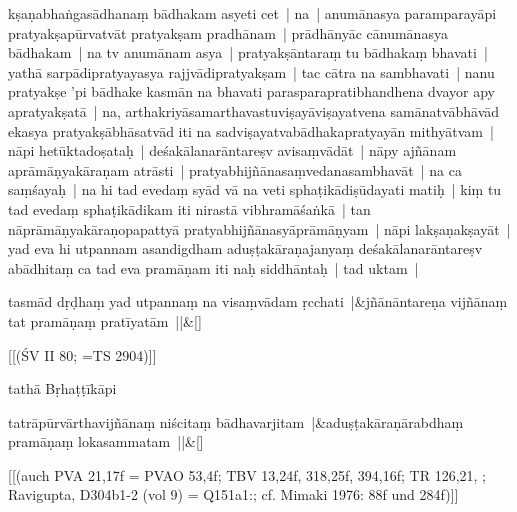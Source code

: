 \documentclass[article,12pt,a4paper]{memoir}
\begin{document}
	  \pstart kṣaṇabhaṅgasādhanaṃ bādhakam asyeti cet | na | anumānasya paramparayāpi pratyakṣapūrvatvāt pratyakṣam pradhānam | prādhānyāc cānumānasya bādhakam | na tv anumānam asya | pratyakṣāntaraṃ tu bādhakaṃ bhavati | yathā sarpādipratyayasya rajjvādipratyakṣam | tac cātra na sambhavati | \label{thakur75-112.28} nanu pratyakṣe 'pi bādhake kasmān na bhavati parasparapratibhandhena dvayor apy apratyakṣatā | \label{thakur75-112.28a} na, arthakriyāsamarthavastuviṣayāviṣayatvena samānatvābhāvād ekasya pratyakṣābhāsatvād iti na sadviṣayatvabādhakapratyayān mithyātvam | \label{thakur75-113.1} nāpi hetūktadoṣataḥ | deśakālanarāntareṣv avisaṃvādāt | \label{thakur75-113.2} nāpy ajñānam aprāmāṇyakāraṇam atrāsti | pratyabhijñānasaṃvedanasambhavāt | \label{thakur75-113.3} na ca saṃśayaḥ | na hi tad evedaṃ syād vā na veti sphaṭikādiṣūdayati matiḥ | kiṃ tu tad evedaṃ sphaṭikādikam iti nirastā vibhramāśaṅkā | tan nāprāmāṇyakāraṇopapattyā pratyabhijñānasyāprāmāṇyam | \label{thakur75-113.5} nāpi lakṣaṇakṣayāt | yad eva hi utpannam asandigdham aduṣṭakāraṇajanyaṃ deśakālanarāntareṣv abādhitaṃ ca tad eva pramāṇam iti naḥ siddhāntaḥ | tad uktam |
	\pend
      
	    
	    \stanza[\smallbreak]
	tasmād dṛḍhaṃ yad utpannaṃ na visaṃvādam ṛcchati |&jñānāntareṇa vijñānaṃ tat pramāṇaṃ pratīyatām ||\&[\smallbreak]


	[[(ŚV II 80; =TS 2904)]]

	  \pstart tathā Bṛhaṭṭīkāpi
	\pend
      
	    
	    \stanza[\smallbreak]
	tatrāpūrvārthavijñānaṃ niścitaṃ bādhavarjitam |&aduṣṭakāraṇārabdhaṃ pramāṇaṃ lokasammatam ||\&[\smallbreak]


	[[(auch PVA 21,17f = PVAO 53,4f; TBV 13,24f, 318,25f, 394,16f; TR 126,21, ; Ravigupta, D304b1-2 (vol 9) = Q151a1:; cf. Mimaki 1976: 88f und 284f)]]
\end{document}
